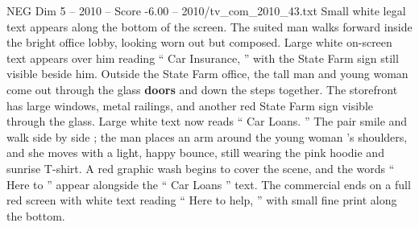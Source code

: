 \begin{textsample}{NEG Dim 5 – 2010 – Score -6.00 – 2010/tv\_com\_2010\_43.txt}
Small white legal text appears along the bottom of the screen.
The suited man walks forward inside the bright office lobby, looking worn out but composed.
Large white on-screen text appears over him reading “ Car Insurance, ” with the State Farm sign still visible beside him.
Outside the State Farm office, the tall man and young woman come out through the glass \textbf{doors} and down the steps together.
The storefront has large windows, metal railings, and another red State Farm sign visible through the glass.
Large white text now reads “ Car Loans. ” The pair smile and walk side by side ; the man places an arm around the young woman ’s shoulders, and she moves with a light, happy bounce, still wearing the pink hoodie and sunrise T-shirt.
A red graphic wash begins to cover the scene, and the words “ Here to ” appear alongside the “ Car Loans ” text.
The commercial ends on a full red screen with white text reading “ Here to help, ” with small fine print along the bottom.

\end{textsample}
